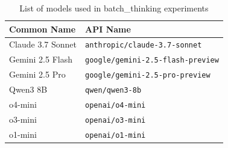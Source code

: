 \begin{table}[h]
\centering
\caption{List of models used in batch\_thinking experiments}
\label{tab:batch_thinking_models}
\begin{tabular}{ll}
\toprule
\textbf{Common Name} & \textbf{API Name} \\
\midrule
Claude 3.7 Sonnet & \texttt{anthropic/claude-3.7-sonnet} \\
Gemini 2.5 Flash & \texttt{google/gemini-2.5-flash-preview} \\
Gemini 2.5 Pro & \texttt{google/gemini-2.5-pro-preview} \\
Qwen3 8B & \texttt{qwen/qwen3-8b} \\
o4-mini & \texttt{openai/o4-mini} \\
o3-mini & \texttt{openai/o3-mini} \\
o1-mini & \texttt{openai/o1-mini} \\
\bottomrule
\end{tabular}
\end{table}